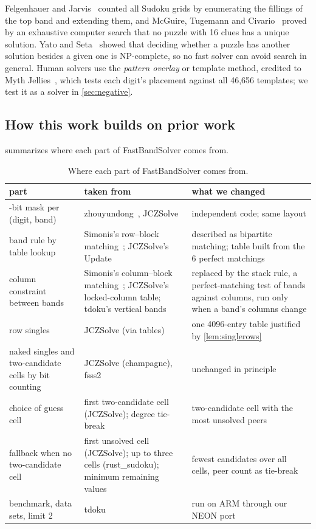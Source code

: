 \documentclass[11pt]{article}
\theoremstyle{definition}
\theoremstyle{plain}
\begin{document}
Felgenhauer and Jarvis~\cite{felgenhauer2006mathematics} counted all Sudoku grids by enumerating the fillings of the
top band and extending them, and McGuire, Tugemann and Civario~\cite{mcguire2014sixteen} proved by an exhaustive computer search that no puzzle with 16 clues has a unique solution. Yato and
Seta~\cite{yato2003complexity} showed that deciding whether a puzzle has another solution besides a given one is
NP-complete, so no fast solver can avoid search in general. Human solvers use the \emph{pattern overlay} or template
method, credited to Myth Jellies~\cite{stuart2008pom}, which tests each digit's placement against all 46{,}656
templates; we test it as a solver in \cref{sec:negative}.

\subsection{How this work builds on prior work}

 summarizes where each part of FastBandSolver comes from.

\begin{table}[t]
\centering
\caption{Where each part of FastBandSolver comes from.}
\label{tab:lineage}
\small
\renewcommand{\arraystretch}{1.25}
\begin{tabular}{>{\raggedright\arraybackslash}p{3.3cm}>{\raggedright\arraybackslash}p{4.6cm}>{\raggedright\arraybackslash}p{6.0cm}}
\toprule
part & taken from & what we changed \\
\midrule
27-bit mask per (digit, band) & zhouyundong~\cite{zhouyundong2012solver}, JCZSolve~\cite{jczsolve2016} & independent code; same layout \\
band rule by table lookup & Simonis's row--block matching~\cite{simonis2005sudoku}; JCZSolve's Update & described as bipartite matching; table built from the 6 perfect matchings \\
column constraint between bands & Simonis's column--block matching~\cite{simonis2005sudoku}; JCZSolve's locked-column table; tdoku's vertical bands & replaced by the stack rule, a perfect-matching test of bands against columns, run only when a band's columns change \\
row singles & JCZSolve (via tables) & one 4096-entry table justified by \cref{lem:singlerows} \\
naked singles and two-candidate cells by bit counting & JCZSolve (champagne), fsss2 & unchanged in principle \\
choice of guess cell & first two-candidate cell (JCZSolve); degree tie-break~\cite{brelaz1979new} & two-candidate cell with the most unsolved peers \\
fallback when no two-candidate cell & first unsolved cell (JCZSolve); up to three cells (rust\_sudoku); minimum remaining values~\cite{haralick1980increasing} & fewest candidates over all cells, peer count as tie-break \\
benchmark, data sets, limit 2 & tdoku~\cite{dillon2019nerdsniped} & run on ARM through our NEON port~\cite{kelly2026tdokuarm} \\
\bottomrule
\end{tabular}
\end{table}
\end{document}
